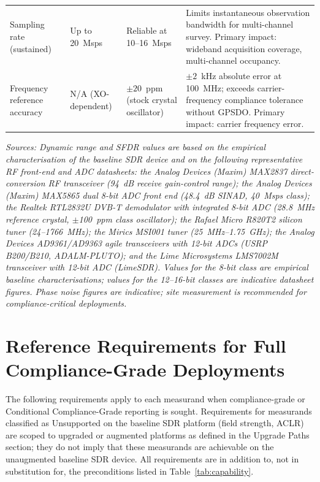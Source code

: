 \documentclass[11pt]{article}
\begin{document}
\begin{longtable}{L{2.6cm}L{2.2cm}L{2.4cm}L{6.4cm}}
Sampling rate (sustained) & Up to 20~Msps & Reliable at 10--16~Msps &
Limits instantaneous observation bandwidth for multi-channel survey. Primary impact: wideband acquisition coverage, multi-channel occupancy. \\

Frequency reference accuracy & N/A (XO-dependent) & $\pm 20$~ppm (stock crystal oscillator) &
$\pm 2$~kHz absolute error at 100~MHz; exceeds carrier-frequency compliance tolerance without GPSDO. Primary impact: carrier frequency error. \\

\end{longtable}

\noindent\small\textit{Sources: Dynamic range and SFDR values are based on the empirical characterisation of the baseline SDR device and on the following representative RF front-end and ADC datasheets: the Analog Devices (Maxim) MAX2837 direct-conversion RF transceiver (94~dB receive gain-control range); the Analog Devices (Maxim) MAX5865 dual 8-bit ADC front end (48.4~dB SINAD, 40~Msps class); the Realtek RTL2832U DVB-T demodulator with integrated 8-bit ADC (28.8~MHz reference crystal, $\pm$100~ppm class oscillator); the Rafael Micro R820T2 silicon tuner (24--1766~MHz); the Mirics MSI001 tuner (25~MHz--1.75~GHz); the Analog Devices AD9361/AD9363 agile transceivers with 12-bit ADCs (USRP B200/B210, ADALM-PLUTO); and the Lime Microsystems LMS7002M transceiver with 12-bit ADC (LimeSDR). Values for the 8-bit class are empirical baseline characterisations; values for the 12--16-bit classes are indicative datasheet figures. Phase noise figures are indicative; site measurement is recommended for compliance-critical deployments.}

\section{Reference Requirements for Full Compliance-Grade Deployments}

The following requirements apply to each measurand when compliance-grade or Conditional Compliance-Grade reporting is sought. Requirements for measurands classified as Unsupported on the baseline SDR platform (field strength, ACLR) are scoped to upgraded or augmented platforms as defined in the Upgrade Paths section; they do not imply that these measurands are achievable on the unaugmented baseline SDR device. All requirements are in addition to, not in substitution for, the preconditions listed in Table~\ref{tab:capability}.
\end{document}
